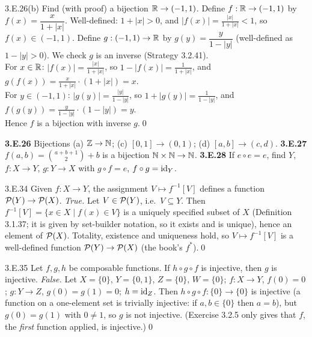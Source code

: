 \begin{bookex}[recommended]{3.E.26(b)}
Find (with proof) a bijection $\mathbb{R}\to(-1,1)$.
\solution
Define $f:\mathbb{R}\to(-1,1)$ by $f(x)=\dfrac{x}{1+|x|}$. Well-defined: $1+|x|>0$, and $|f(x)|=\frac{|x|}{1+|x|}<1$, so $f(x)\in(-1,1)$. Define $g:(-1,1)\to\mathbb{R}$ by $g(y)=\dfrac{y}{1-|y|}$ (well-defined as $1-|y|>0$). We check $g$ is an inverse (Strategy 3.2.41).\\
For $x\in\mathbb{R}$: $|f(x)|=\frac{|x|}{1+|x|}$, so $1-|f(x)|=\frac1{1+|x|}$, and $g(f(x))=\frac{x}{1+|x|}\cdot(1+|x|)=x$.\\
For $y\in(-1,1)$: $|g(y)|=\frac{|y|}{1-|y|}$, so $1+|g(y)|=\frac1{1-|y|}$, and $f(g(y))=\frac{y}{1-|y|}\cdot(1-|y|)=y$.\\
Hence $f$ is a bijection with inverse $g$.\qed
\end{bookex}

\begin{trybox}[{3.E.26(a),(c),(d), 3.E.27, 3.E.28 \fO\ (26cd bonus)}]
\textbf{3.E.26} Bijections (a) $\mathbb{Z}\to\mathbb{N}$; (c) $[0,1]\to(0,1)$; (d) $[a,b]\to(c,d)$. \quad \textbf{3.E.27} $f(a,b)=\binom{a+b+1}2+b$ is a bijection $\mathbb{N}\times\mathbb{N}\to\mathbb{N}$. \quad \textbf{3.E.28} If $e\circ e=e$, find $Y$, $f:X\to Y$, $g:Y\to X$ with $g\circ f=e$, $f\circ g=\mathrm{id}_Y$. 
\end{trybox}

\begin{bookex}[essential]{3.E.34}
Given $f:X\to Y$, the assignment $V\mapsto f^{-1}[V]$ defines a function $\mathcal{P}(Y)\to\mathcal{P}(X)$.
\solution
\emph{True.} Let $V\in\mathcal{P}(Y)$, i.e.\ $V\subseteq Y$. Then $f^{-1}[V]=\{x\in X\mid f(x)\in V\}$ is a uniquely specified subset of $X$ (Definition 3.1.37; it is given by set-builder notation, so it exists and is unique), hence an element of $\mathcal{P}(X)$. Totality, existence and uniqueness hold, so $V\mapsto f^{-1}[V]$ is a well-defined function $\mathcal{P}(Y)\to\mathcal{P}(X)$ (the book's $f^*$).\qed
\end{bookex}

\begin{bookex}[recommended]{3.E.35}
Let $f,g,h$ be composable functions. If $h\circ g\circ f$ is injective, then $g$ is injective.
\solution
\emph{False.} Let $X=\{0\}$, $Y=\{0,1\}$, $Z=\{0\}$, $W=\{0\}$; $f:X\to Y$, $f(0)=0$; $g:Y\to Z$, $g(0)=g(1)=0$; $h=\mathrm{id}_Z$. Then $h\circ g\circ f:\{0\}\to\{0\}$ is injective (a function on a one-element set is trivially injective: if $a,b\in\{0\}$ then $a=b$), but $g(0)=g(1)$ with $0\ne1$, so $g$ is not injective. (Exercise 3.2.5 only gives that $f$, the \emph{first} function applied, is injective.)\qed
\end{bookex}

